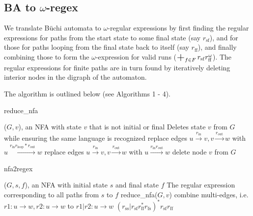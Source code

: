 \documentclass[conference]{IEEEtran}
\theoremstyle{definition}
\theoremstyle{remark}
\DeclareMathOperator*{\bigplus}{\scalerel*{+}{\sum}}
\newcommand{\Buchi}{B\"{u}chi }
\begin{document}
\subsection{BA to $\omega$-regex} \label{aut2regex}
We translate \Buchi automata to $\omega$-regular expressions by first finding the regular expressions for paths from the start state to some final state (say $r_\mathrm{sf}$), and for those for paths looping from the final state back to itself (say $r_\mathrm{ff}$), and finally combining those to form the $\omega$-expression for valid runs ($\bigplus_{f\in F} r_\mathrm{sf}r_\mathrm{ff}^\omega$). The regular expressions for finite paths are in turn found by iteratively deleting interior nodes in the digraph of the automaton.

The algorithm is outlined below (see Algorithms 1 - 4). %

\begin{algorithm}[h!]
    \caption{reduce\_nfa}
    \begin{algorithmic}
        \Require ($G, v$), an NFA with state $v$ that is not initial or final
        \Ensure Deletes state $v$ from $G$ while ensuring the same language is recognized
                \State replace edges $u\xrightarrow{r_\mathrm{in}} v, v \xrightarrow{r_\mathrm{out}} w$ with $u \xrightarrow{r_\mathrm{in} r_\mathrm{loop}* r_\mathrm{out}} w$
            \Else
                \State replace edges $u\xrightarrow{r_\mathrm{in}} v, v \xrightarrow{r_\mathrm{out}} w$ with $u \xrightarrow{r_\mathrm{in}  r_\mathrm{out}} w$
            \EndIf
        \EndFor
	\State delete node $v$ from $G$
    \end{algorithmic}
\end{algorithm}

\begin{algorithm}[h!]
    \caption{nfa2regex}
    \begin{algorithmic}
        \Require ($G, s, f$), an NFA with initial state $s$ and final state $f$
        \Ensure The regular expression corresponding to all paths from $s$ to $f$
            \State reduce\_nfa($G, v$)
            \State combine multi-edges, i.e. $r1 : u \to w, r2 : u \to w$  to $r1 | r2 : u \to w$
        \EndWhile
        \State \Return $(r_\mathrm{ss}| r_\mathrm{sf} r_\mathrm{ff}^* r_\mathrm{fs})^* r_\mathrm{sf} r_\mathrm{ff}$
    \end{algorithmic}
\end{algorithm}
\end{document}
